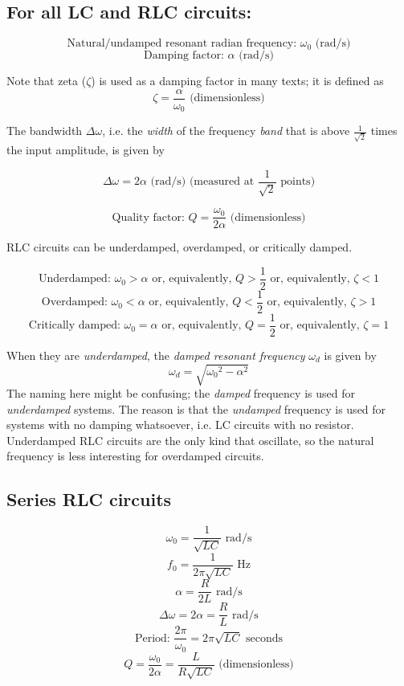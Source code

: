 \documentclass[12pt,a4paper]{report}
\begin{document}
\subsection{For all LC and RLC circuits:}

\[ \text{Natural/undamped resonant radian frequency: } \omega_0 \text{ (rad/s)} \]
\[ \text{Damping factor: } \alpha \text{ (rad/s)} \]

Note that zeta ($\zeta$) is used as a damping factor in many texts; it is defined as
\[ \zeta = \frac{\alpha}{\omega_0} \text{ (dimensionless)} \]

The bandwidth $\Delta \omega$, i.e. the \emph{width} of the frequency \emph{band} that is above $\displaystyle \frac{1}{\sqrt{2}}$ times the input amplitude, is given by

\[ \Delta \omega = 2 \alpha \text{ (rad/s) (measured at } \frac{1}{\sqrt{2}} \text{ points)} \]

\[ \text{Quality factor: } Q = \frac{\omega_0}{2\alpha} \text{ (dimensionless)} \]

RLC circuits can be underdamped, overdamped, or critically damped.

\[ \text{Underdamped: } \omega_0 > \alpha \text{ or, equivalently, } Q > \frac{1}{2} \text { or, equivalently, } \zeta < 1 \]
\[ \text{Overdamped: } \omega_0 < \alpha \text{ or, equivalently, } Q < \frac{1}{2} \text { or, equivalently, } \zeta > 1 \]
\[ \text{Critically damped: } \omega_0 = \alpha \text{ or, equivalently, } Q = \frac{1}{2} \text { or, equivalently, } \zeta = 1 \]

When they are \emph{underdamped}, the \emph{damped resonant frequency} $\omega_d$ is given by
\[ \omega_d = \sqrt{{\omega_0}^2 - \alpha^2} \]
The naming here might be confusing; the \emph{damped} frequency is used for \emph{underdamped} systems. The reason is that the \emph{undamped} frequency is used for systems with no damping whatsoever, i.e. LC circuits with no resistor.\\
Underdamped RLC circuits are the only kind that oscillate, so the natural frequency is less interesting for overdamped circuits.

\subsection{Series RLC circuits}

\[ \omega_0 = \frac{1}{\sqrt{LC}} \text{ rad/s} \]
\[ f_0 = \frac{1}{2\pi \sqrt{LC}} \text { Hz} \]
\[ \alpha = \frac{R}{2L} \text{ rad/s} \]
\[ \Delta \omega = 2\alpha = \frac{R}{L} \text { rad/s} \]
\[ \text{Period: } \frac{2\pi}{\omega_0} = 2\pi \sqrt{LC} \text { seconds} \]
\[ Q = \frac{\omega_0}{2\alpha} = \frac{L}{R\sqrt{LC}} \text { (dimensionless)} \]
\end{document}

